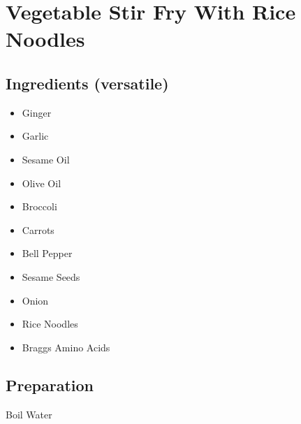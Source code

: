 \thispagestyle{fancy}
\section{Vegetable Stir Fry With Rice Noodles}
\AddToShipoutPicture*{\StirFryRiceNoodles}

\subsection*{Ingredients (versatile)}
\begin{multicols}{3}
	\begin{itemize}
		\item Ginger
		\item Garlic
		\item Sesame Oil
		\item Olive Oil
		\item Broccoli
		\item Carrots
		\item Bell Pepper
		\item Sesame Seeds
		\item Onion
		\item Rice Noodles
		\item Braggs Amino Acids
	\end{itemize}
\end{multicols}

\subsection*{Preparation}

Boil Water